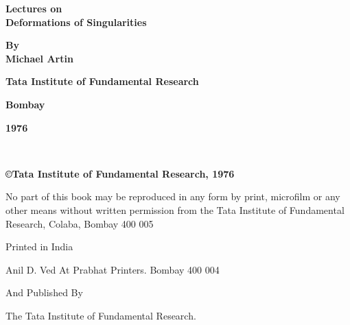 \thispagestyle{empty}
\begin{center}
{\Large\bf Lectures on}\\[5pt]
{\Large\bf Deformations of Singularities}
\vfill

{\bf By}\\[5pt]
{\large\bf Michael Artin}
\vfill

{\bf Tata Institute of Fundamental Research}

{\bf Bombay}

{\bf 1976}
\end{center}

\eject

~\thispagestyle{empty}
\vfill

\begin{center}
{\large\bf \copyright Tata Institute of Fundamental Research, 1976}
\vfill

\parbox{0.7\textwidth}{No part of this book may be reproduced in any 
form by print, microfilm or any other means without written permission
from the Tata Institute of Fundamental Research, Colaba, 
Bombay 400 005}
\vfill 

Printed in India
\smallskip

Anil D. Ved At Prabhat Printers. Bombay 400 004
\smallskip

And Published By

\smallskip

The Tata Institute of Fundamental Research.
\end{center}

